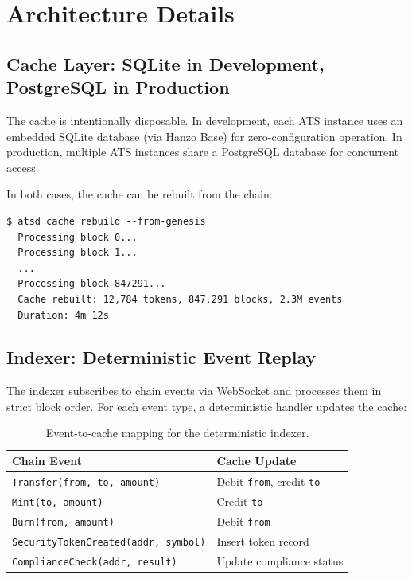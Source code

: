\documentclass[11pt,a4paper]{article}
\begin{document}
\section{Architecture Details}
\label{sec:architecture}

\subsection{Cache Layer: SQLite in Development, PostgreSQL in Production}

The cache is intentionally disposable.  In development, each ATS
instance uses an embedded SQLite database (via Hanzo Base) for
zero-configuration operation.  In production, multiple ATS instances
share a PostgreSQL database for concurrent access.

In both cases, the cache can be rebuilt from the chain:

\begin{verbatim}
$ atsd cache rebuild --from-genesis
  Processing block 0...
  Processing block 1...
  ...
  Processing block 847291...
  Cache rebuilt: 12,784 tokens, 847,291 blocks, 2.3M events
  Duration: 4m 12s
\end{verbatim}

\subsection{Indexer: Deterministic Event Replay}

The indexer subscribes to chain events via WebSocket and processes
them in strict block order.  For each event type, a deterministic
handler updates the cache:

\begin{table}[h]
\centering
\begin{tabular}{ll}
\toprule
\textbf{Chain Event} & \textbf{Cache Update} \\
\midrule
\texttt{Transfer(from, to, amount)} & Debit \texttt{from}, credit
  \texttt{to} \\
\texttt{Mint(to, amount)} & Credit \texttt{to} \\
\texttt{Burn(from, amount)} & Debit \texttt{from} \\
\texttt{SecurityTokenCreated(addr, symbol)} & Insert token record \\
\texttt{ComplianceCheck(addr, result)} & Update compliance status \\
\bottomrule
\end{tabular}
\caption{Event-to-cache mapping for the deterministic indexer.}
\label{tab:events}
\end{table}
\end{document}
